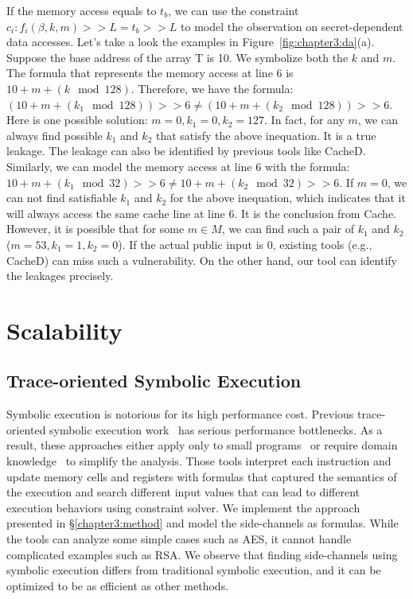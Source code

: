 If the memory access equals to $t_b$, we can use the constraint $c_i :
  f_i(\beta, k, m) >> L = t_b >> L$ to model the observation on secret-dependent
data accesses. Let's take a look the examples in Figure~\ref{fig:chapter3:da}(a).
Suppose the base address of the array \textsf{T} is 10. We symbolize both the $k$ and $m$. The formula that represents the memory access at line 6 is $10 + m + (k \mod 128)$. Therefore, we have the formula: $(10 + m + (k_1 \mod 128)) >> 6  \neq (10 + m + (k_2 \mod 128)) >> 6$.
Here is one possible solution: $m = 0, k_1 = 0, k_2 = 127$. In fact, for any $m$, we can always find possible $k_1$ and $k_2$ that satisfy the above inequation. It is a true leakage. The leakage can also be identified by previous tools like CacheD. Similarly, we can model the memory access at line 6 with the formula:  $10 + m + (k_1 \mod 32) >> 6  \neq 10 + m + (k_2 \mod 32) >> 6$. If $m = 0$, we can not find satisfiable $k_1$ and $k_2$ for the above inequation, which indicates that it will always access the same cache line at line 6. It is the conclusion from Cache. However, it is possible that for some $m \in M$, we can find such a pair of $k_1$ and $k_2$ ($m = 53, k_1 = 1, k_2 = 0$). If the actual public input is $0$, existing tools (e.g., CacheD) can miss such a vulnerability. On the other hand, our tool can identify the leakages precisely.

\section{Scalability}
\subsection{Trace-oriented Symbolic Execution}
Symbolic execution is notorious for its high performance cost.
Previous trace-oriented symbolic execution
work~\cite{203878,Chattopadhyay:2017:QIL:3127041.3127044} has serious
performance bottlenecks. As a result, these approaches either apply only to
small programs~\cite{Chattopadhyay:2017:QIL:3127041.3127044} or require
domain knowledge~\cite{Wang:2007:NCD:1250662.1250723} to simplify the analysis.
Those tools interpret each
instruction and update memory cells and registers with formulas that
captured the semantics of the execution and search different input values that
can lead to different execution behaviors using constraint solver.
We implement the approach presented in \S\ref{chapter3:method} and model the side-channels as formulas. While the tools can analyze some simple cases such as AES, it cannot handle complicated examples such as RSA.
We observe that finding side-channels using symbolic execution differs from
traditional symbolic execution, and it can be optimized to be as efficient
as other methods.


